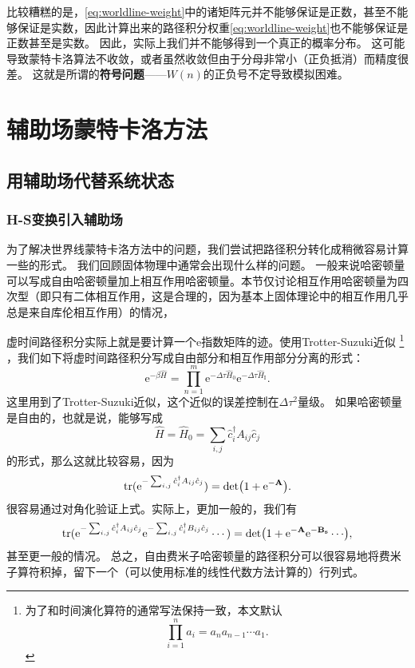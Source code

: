 \documentclass[hyperref, UTF8, a4paper]{ctexart}
\newcommand*{\ee}{\mathrm{e}}
\newcommand*{\concept}[1]{{\textbf{#1}}}
\begin{document}

比较糟糕的是，\eqref{eq:worldline-weight}中的诸矩阵元并不能够保证是正数，甚至不能够保证是实数，因此计算出来的路径积分权重\eqref{eq:worldline-weight}也不能够保证是正数甚至是实数。
因此，实际上我们并不能够得到一个真正的概率分布。
这可能导致蒙特卡洛算法不收敛，或者虽然收敛但由于分母非常小（正负抵消）而精度很差。
这就是所谓的\concept{符号问题}——$W(n)$的正负号不定导致模拟困难。

\section{辅助场蒙特卡洛方法}

\subsection{用辅助场代替系统状态}

\subsubsection{H-S变换引入辅助场}

为了解决世界线蒙特卡洛方法中的问题，我们尝试把路径积分转化成稍微容易计算一些的形式。
我们回顾固体物理中通常会出现什么样的问题。
一般来说哈密顿量可以写成自由哈密顿量加上相互作用哈密顿量。本节仅讨论相互作用哈密顿量为四次型（即只有二体相互作用，这是合理的，因为基本上固体理论中的相互作用几乎总是来自库伦相互作用）的情况，

虚时间路径积分实际上就是要计算一个$\ee$指数矩阵的迹。使用Trotter-Suzuki近似%
\footnote{为了和时间演化算符的通常写法保持一致，本文默认
\[
    \prod_{i=1}^n a_i = a_n a_{n-1} \cdots a_1.
\]
}%
，我们如下将虚时间路径积分写成自由部分和相互作用部分分离的形式：
\[
    \ee^{-\beta \hat{H}} = \prod_{n=1}^{m} \ee^{-\Delta \tau \hat{H}_0} \ee^{-\Delta \tau \hat{H}_\text{I}}.
\]
这里用到了Trotter-Suzuki近似，这个近似的误差控制在$\Delta \tau^2$量级。%
如果哈密顿量是自由的，也就是说，能够写成
\[
    \hat{H} = \hat{H}_0 = \sum_{i, j} \hat{c}_i^\dagger A_{ij} \hat{c}_j
\]
的形式，那么这就比较容易，因为
\begin{equation}
    \trace(\ee^{- \sum_{i, j} \hat{c}_i^\dagger A_{ij} \hat{c}_j}) = \det(1 + \ee^{- \vb{A}}).
\end{equation}
很容易通过对角化验证上式。实际上，更加一般的，我们有
\begin{equation}
    \trace(\ee^{- \sum_{i, j} \hat{c}_i^\dagger A_{ij} \hat{c}_j} \ee^{- \sum_{i, j} \hat{c}_i^\dagger B_{ij} \hat{c}_j} \cdots) = \det(1 + \ee^{- \vb{A}}\ee^{- \vb{B}_{\vb{s}}} \cdots),
    \label{eq:trace-to-det}
\end{equation}
甚至更一般的情况。
总之，自由费米子哈密顿量的路径积分可以很容易地将费米子算符积掉，留下一个（可以使用标准的线性代数方法计算的）行列式。
\end{document}

